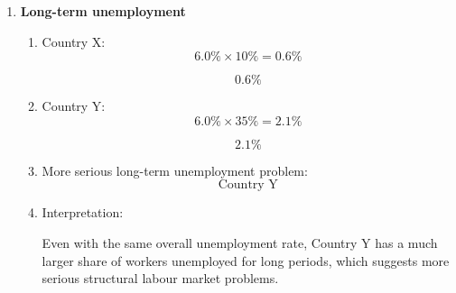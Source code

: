 \documentclass[12pt]{article}
\begin{document}
\begin{enumerate}[label=\textbf{Question \arabic*.}]
\begin{enumerate}[label=(\alph*)]
    \item Initial unemployment rate:
    \[
    \frac{180{,}000}{3{,}000{,}000}\times 100 = 6\%
    \]

    \[
    \boxed{6\%}
    \]

    \item New unemployed:
    \[
    180{,}000 + 30{,}000 = 210{,}000
    \]

    \[
    \boxed{210{,}000}
    \]

    \item New labour force:
    \[
    3{,}000{,}000 - 40{,}000 + 30{,}000 = 2{,}990{,}000
    \]

    \[
    \boxed{2{,}990{,}000}
    \]

    \item New unemployment rate:
    \[
    \frac{210{,}000}{2{,}990{,}000}\times 100 \approx 7.02\%
    \]

    \[
    \boxed{7.02\%}
    \]

    \item Interpretation:

    The unemployment rate does not capture all hardship because discouraged workers who stop searching are removed from the labour force and no longer counted as unemployed.
\end{enumerate}


\item \textbf{Long-term unemployment}

\begin{enumerate}[label=(\alph*)]
    \item Country X:
    \[
    6.0\%\times 10\% = 0.6\%
    \]

    \[
    \boxed{0.6\%}
    \]

    \item Country Y:
    \[
    6.0\%\times 35\% = 2.1\%
    \]

    \[
    \boxed{2.1\%}
    \]

    \item More serious long-term unemployment problem:
    \[
    \boxed{\text{Country Y}}
    \]

    \item Interpretation:

    Even with the same overall unemployment rate, Country Y has a much larger share of workers unemployed for long periods, which suggests more serious structural labour market problems.
\end{enumerate}


\end{enumerate}
\end{document}
